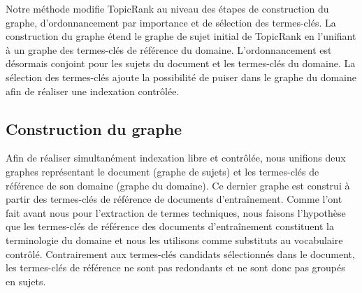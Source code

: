   Notre méthode modifie TopicRank au niveau des étapes de construction du
  graphe, d'ordonnancement par importance et de sélection des termes-clés. La
  construction du graphe étend le graphe de sujet initial de TopicRank en
  l'unifiant à un graphe des termes-clés de référence du domaine.
  L'ordonnancement est désormais conjoint pour les sujets du document et les
  termes-clés du domaine. La sélection des termes-clés ajoute la possibilité de
  puiser dans le graphe du domaine afin de réaliser une indexation contrôlée.

  \subsection{Construction du graphe}
  \label{subsec:main-domain_specific_keyphrase_annotation-supervised_automatic_keyphrase_extraction-topiccorank-graph_construction}
    Afin de réaliser simultanément indexation libre et contrôlée, nous unifions
    deux graphes représentant le document (graphe de sujets) et les termes-clés
    de référence de son domaine (graphe du domaine). Ce dernier graphe est
    construi à partir des termes-clés de référence de documents d'entraînement.
    Comme  l'ont fait avant nous
    pour l'extraction de termes techniques, nous faisons l'hypothèse que les
    termes-clés de référence des documents d'entraînement constituent la
    terminologie du domaine et nous les utilisons comme substituts au
    vocabulaire contrôlé. Contrairement aux termes-clés candidats sélectionnés
    dans le document, les termes-clés de référence ne sont pas redondants et ne
    sont donc pas groupés en sujets.

